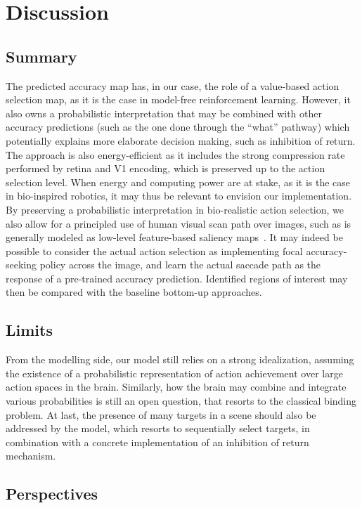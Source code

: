 \section{Discussion}
\label{sec:discussion}
\ICANN
\else

\subsection{Summary}
\fi
The predicted accuracy map has, in our case, the role of a value-based action selection map, as it is the case in model-free reinforcement learning. However, it also owns a probabilistic interpretation that may be combined with other accuracy predictions (such as the one done through the ``what'' pathway) which potentially explains more elaborate decision making, such as inhibition of return. The approach is also energy-efficient as it includes the strong compression rate performed by retina and V1 encoding, which is preserved up to the action selection level. When energy and computing power are at stake, as it is the case in bio-inspired robotics, it may thus be relevant to envision our implementation. By preserving a probabilistic interpretation in bio-realistic action selection, we also allow for a principled use of human visual scan path over images, such as is generally modeled as low-level feature-based saliency maps~\citep{Itti01}. It may indeed be possible to consider the actual action selection as implementing focal accuracy-seeking policy across the image, and learn the actual saccade path as the response of a pre-trained accuracy prediction. Identified regions of interest may then be compared with the baseline bottom-up approaches.

\ICANN
\else
\subsection{Limits}
\fi


From the modelling side, our model still relies on a strong idealization, assuming the existence of a probabilistic representation of action achievement over large action spaces in the brain. Similarly, how the brain may combine and integrate various probabilities is still an open question, that resorts to the classical binding problem. %
At last, the presence of many targets in a scene should also be addressed by the model, which resorts to sequentially select targets, in combination with a concrete implementation of an inhibition of return mechanism.
\ICANN
\else


\subsection{Perspectives}
\fi